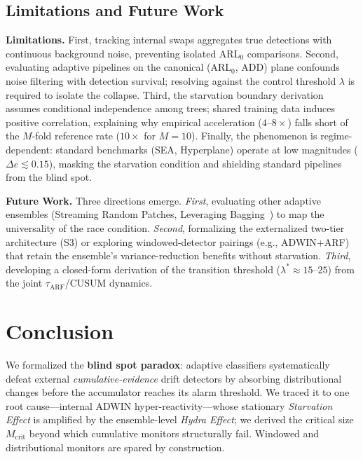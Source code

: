 \documentclass[10pt,conference]{IEEEtran}
\theoremstyle{definition}
\begin{document}
\subsection{Limitations and Future Work}\label{sec:limitations}
\textbf{Limitations.} First, tracking internal swaps aggregates true detections with continuous background noise, preventing isolated ARL$_0$ comparisons. Second, evaluating adaptive pipelines on the canonical (ARL$_0$, ADD) plane confounds noise filtering with detection survival; resolving against the control threshold $\lambda$ is required to isolate the collapse. Third, the starvation boundary derivation assumes conditional independence among trees; shared training data induces positive correlation, explaining why empirical acceleration ($4$--$8\times$) falls short of the $M$-fold reference rate ($10\times$ for $M{=}10$). Finally, the phenomenon is regime-dependent: standard benchmarks (SEA, Hyperplane) operate at low magnitudes ($\Delta e \lesssim 0.15$), masking the starvation condition and shielding standard pipelines from the blind spot.

\textbf{Future Work.} Three directions emerge. \emph{First}, evaluating other adaptive ensembles (Streaming Random Patches, Leveraging Bagging~\cite{bifet_leveraging_2010}) to map the universality of the race condition. \emph{Second}, formalizing the externalized two-tier architecture (S3) or exploring windowed-detector pairings (e.g., ADWIN+ARF) that retain the ensemble's variance-reduction benefits without starvation. \emph{Third}, developing a closed-form derivation of the transition threshold ($\lambda^* \approx 15$--$25$) from the joint $\tau_{\mathrm{ARF}}$/CUSUM dynamics.

\section{Conclusion}\label{sec:conclusion}

We formalized the \textbf{blind spot paradox}: adaptive classifiers systematically defeat external \emph{cumulative-evidence} drift detectors by absorbing distributional changes before the accumulator reaches its alarm threshold. We traced it to one root cause---internal ADWIN hyper-reactivity---whose stationary \emph{Starvation Effect} is amplified by the ensemble-level \emph{Hydra Effect}; we derived the critical size $M_{\mathrm{crit}}$ beyond which cumulative monitors structurally fail. Windowed and distributional monitors are spared by construction.
\end{document}
